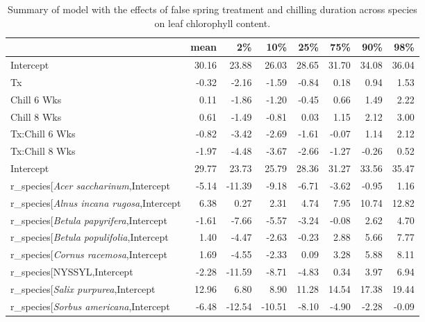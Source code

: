 \documentclass{article}\usepackage[]{graphicx}\usepackage[]{color}
\makeatletter
\newenvironment{kframe}{%
 \def\at@end@of@kframe{}%
 \ifinner\ifhmode%
  \def\at@end@of@kframe{\end{minipage}}%
  \begin{minipage}{\columnwidth}%
 \fi\fi%
 \def\FrameCommand##1{\hskip\@totalleftmargin \hskip-\fboxsep
 \colorbox{shadecolor}{##1}\hskip-\fboxsep
     \hskip-\linewidth \hskip-\@totalleftmargin \hskip\columnwidth}%
 \MakeFramed {\advance\hsize-\width
   \@totalleftmargin\z@ \linewidth\hsize
   \@setminipage}}%
 {\par\unskip\endMakeFramed%
 \at@end@of@kframe}
\makeatother
\begin{document}
\newpage
\begin{kframe}


{\ttfamily\noindent\bfseries\color{errorcolor}{\#\# Error in gsub("{}r\_species["{}, "{}"{}, modoutput\$term): invalid regular expression 'r\_species[', reason 'Missing ']''}}\end{kframe}%
\begin{longtable}{lrrrrrrr}
\caption{Summary of model with the effects of false spring treatment and chilling duration across species on leaf chlorophyll content.} \\ 
  \hline
 & mean & 2\% & 10\% & 25\% & 75\% & 90\% & 98\% \\ 
  \hline \endhead  \hline
Intercept & 30.16 & 23.88 & 26.03 & 28.65 & 31.70 & 34.08 & 36.04 \\ 
  Tx & -0.32 & -2.16 & -1.59 & -0.84 & 0.18 & 0.94 & 1.53 \\ 
  Chill 6 Wks & 0.11 & -1.86 & -1.20 & -0.45 & 0.66 & 1.49 & 2.22 \\ 
  Chill 8 Wks & 0.61 & -1.49 & -0.81 & 0.03 & 1.15 & 2.12 & 3.00 \\ 
  Tx:Chill 6 Wks & -0.82 & -3.42 & -2.69 & -1.61 & -0.07 & 1.14 & 2.12 \\ 
  Tx:Chill 8 Wks & -1.97 & -4.48 & -3.67 & -2.66 & -1.27 & -0.26 & 0.52 \\ 
  Intercept & 29.77 & 23.73 & 25.79 & 28.36 & 31.27 & 33.56 & 35.47 \\ 
  r_species[\textit{Acer saccharinum},Intercept & -5.14 & -11.39 & -9.18 & -6.71 & -3.62 & -0.95 & 1.16 \\ 
  r_species[\textit{Alnus incana rugosa},Intercept & 6.38 & 0.27 & 2.31 & 4.74 & 7.95 & 10.74 & 12.82 \\ 
  r_species[\textit{Betula papyrifera},Intercept & -1.61 & -7.66 & -5.57 & -3.24 & -0.08 & 2.62 & 4.70 \\ 
  r_species[\textit{Betula populifolia},Intercept & 1.40 & -4.47 & -2.63 & -0.23 & 2.88 & 5.66 & 7.77 \\ 
  r_species[\textit{Cornus racemosa},Intercept & 1.69 & -4.55 & -2.33 & 0.09 & 3.28 & 5.88 & 8.11 \\ 
  r_species[NYSSYL,Intercept & -2.28 & -11.59 & -8.71 & -4.83 & 0.34 & 3.97 & 6.94 \\ 
  r_species[\textit{Salix purpurea},Intercept & 12.96 & 6.80 & 8.90 & 11.28 & 14.54 & 17.38 & 19.44 \\ 
  r_species[\textit{Sorbus americana},Intercept & -6.48 & -12.54 & -10.51 & -8.10 & -4.90 & -2.28 & -0.09 \\ 

\end{longtable}
\end{document}
